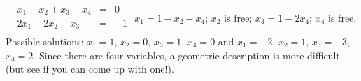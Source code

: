 {$\begin{array}{rcl}
-x_1-x_2+x_3+x_4&=&0\\
-2x_1-2x_2+x_3&=&-1\\
\end{array}$}
{$x_1=1-x_2-x_4$; $x_2$ is free; $x_3=1-2x_4$; $x_4$ is free. Possible solutions: $x_1 = 1$, $x_2 = 0$, $x_3 = 1$, $x_4 = 0$ and $x_1 = -2$, $x_2 = 1$, $x_3 = -3$, $x_4=2$. Since there are four variables, a geometric description is more difficult (but see if you can come up with one!). }